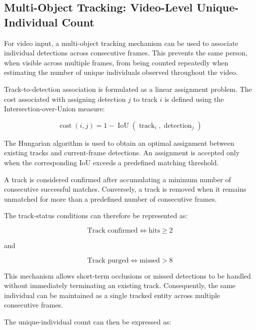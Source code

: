 \documentclass[12pt,a4paper]{report}
\begin{document}
\subsection{Multi-Object Tracking: Video-Level Unique-Individual Count}

For video input, a multi-object tracking mechanism can be used to associate
individual detections across consecutive frames. This prevents the same
person, when visible across multiple frames, from being counted repeatedly
when estimating the number of unique individuals observed throughout the
video.

Track-to-detection association is formulated as a linear assignment
problem. The cost associated with assigning detection $j$ to track $i$ is
defined using the Intersection-over-Union measure:

\begin{equation}
\operatorname{cost}(i,j)
=
1-\operatorname{IoU}
\left(
\operatorname{track}_i,
\operatorname{detection}_j
\right)
\label{eq:tracking-cost}
\end{equation}

The Hungarian algorithm is used to obtain an optimal assignment between
existing tracks and current-frame detections. An assignment is accepted
only when the corresponding IoU exceeds a predefined matching threshold.

A track is considered confirmed after accumulating a minimum number of
consecutive successful matches. Conversely, a track is removed when it
remains unmatched for more than a predefined number of consecutive frames.

The track-status conditions can therefore be represented as:

\begin{equation}
\text{Track confirmed}
\iff
\text{hits}\geq 2
\label{eq:track-confirmed}
\end{equation}

and

\begin{equation}
\text{Track purged}
\iff
\text{missed}>8
\label{eq:track-purged}
\end{equation}

This mechanism allows short-term occlusions or missed detections to be
handled without immediately terminating an existing track. Consequently,
the same individual can be maintained as a single tracked entity across
multiple consecutive frames.

The unique-individual count can then be expressed as:
\end{document}
